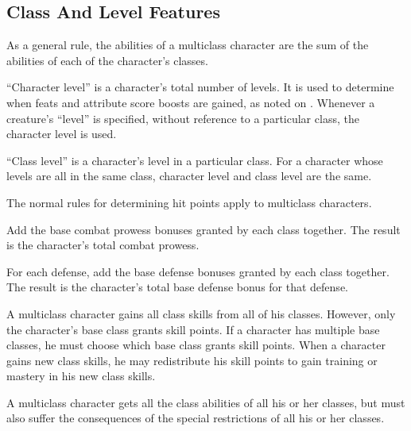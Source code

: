     \subsection{Class And Level Features}
        As a general rule, the abilities of a multiclass character are the sum
        of the abilities of each of the character's classes.

        ``Character level'' is a character's total number of levels.
        It is used to determine when feats and attribute score boosts are gained, as noted on .
        Whenever a creature's ``level'' is specified, without reference to a particular class, the character level is used.

        \par ``Class level'' is a character's level in a particular class.
        For a character whose levels are all in the same class, character level and class level are the same.

        The normal rules for determining hit points apply to multiclass characters.

        Add the base combat prowess bonuses granted by each class together.
        The result is the character's total combat prowess.

        For each defense, add the base defense bonuses granted by each class together.
        The result is the character's total base defense bonus for that defense.

        A multiclass character gains all class skills from all of his classes.
        However, only the character's base class grants skill points.
        If a character has multiple base classes, he must choose which base class grants skill points.
        When a character gains new class skills, he may redistribute his skill points to gain training or mastery in his new class skills.

        A multiclass character gets all the class abilities of all his or her classes, but must also suffer the consequences of the special restrictions of all his or her classes.

